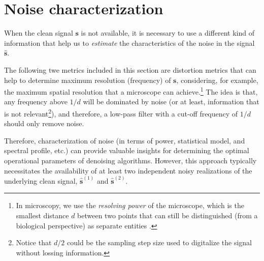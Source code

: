

\section{Noise characterization}

When the clean signal $\mathbf{s}$ is not available, it is necessary
to use a different kind of information that help us to \emph{estimate}
the characteristics of the noise in the signal $\hat{\mathbf{s}}$.

The following twe metrics included in this section are distortion
metrics that can help to determine maximum resolution (frequency) of
$\mathbf{s}$, considering, for example, the maximum spatial resolution
that a microscope can achieve.\footnote{In microscopy, we use the
  \emph{resolving power} of the microscope, which is the smallest
  distance $d$ between two points that can still be distinguished
  (from a biological perspective) as separate entities
  \cite{nieuwenhuizen2013measuring}.} The idea is that, any frequency
above $1/d$ will be dominated by noise (or at least, information that
is not relevant\footnote{Notice that $d/2$ could be the sampling step
  size used to digitalize the signal without lossing information.}),
and therefore, a low-pass filter with a cut-off frequency of $1/d$
should only remove noise.

Therefore, characterization of noise (in terms of power, statistical
model, and spectral profile, etc.) can provide valuable insights for
determining the optimal operational parameters of denoising
algorithms. However, this approach typically necessitates the
availability of at least two independent noisy realizations of the
underlying clean signal, $\hat{\mathbf{s}}^{(1)}$ and
$\hat{\mathbf{s}}^{(2)}$.

\begin{comment}
Noise can be additive or multiplicative. In the first case, noise is
signal independent between samples of the same signal instance, and
between samples of different instances, even if we consider the same
sample index. In the second case, the power of the noise depends on
the power of the signal, and therefore, if we can estimate the signal,
we can estimate, for example, the local variance of the noise after
supposing some statistical model. Notice, however, that in any case,
we must known, at least two (inevitable noisy) instances of the clean
signal.
\end{comment}

